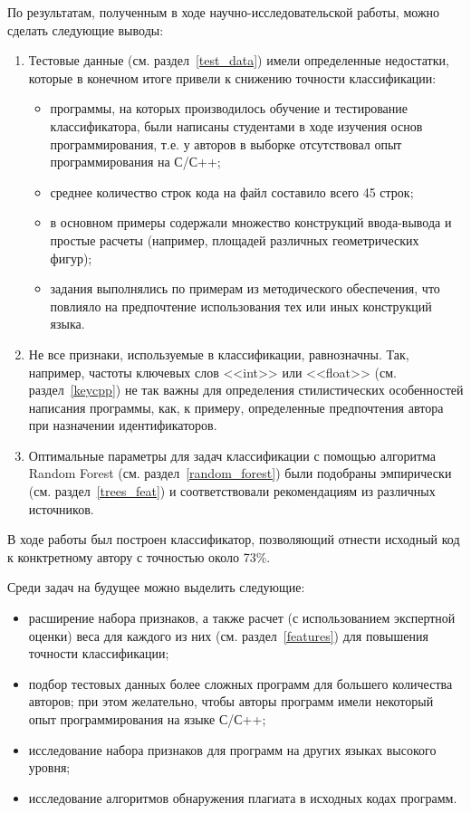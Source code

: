По результатам, полученным в ходе научно-исследовательской работы, можно сделать следующие выводы:
\begin{enumerate}
  \item Тестовые данные (см. раздел~\ref{test_data}) имели определенные недостатки, которые в конечном итоге привели к снижению точности классификации:
  \begin{itemize}
    \item программы, на которых производилось обучение и тестирование классификатора, были написаны студентами в ходе изучения основ программирования, т.е. у авторов в выборке отсутствовал опыт программирования на С/С++;
    \item среднее количество строк кода на файл составило всего 45 строк;
    \item в основном примеры содержали множество конструкций ввода-вывода и простые расчеты (например, площадей различных геометрических фигур);
    \item задания выполнялись по примерам из методического обеспечения, что повлияло на предпочтение использования тех или иных конструкций языка.
  \end{itemize}
  \item Не все признаки, используемые в классификации, равнозначны. Так, например, частоты ключевых слов <<int>> или <<float>> (см. раздел~\ref{keycpp}) не так важны для определения стилистических особенностей написания программы, как, к примеру, определенные предпочтения автора при назначении идентификаторов.
  \item Оптимальные параметры для задач классификации с помощью алгоритма Random Forest (см. раздел~\ref{random_forest}) были подобраны эмпирически (см. раздел~\ref{trees_feat}) и соответствовали рекомендациям из различных источников.
\end{enumerate}

В ходе работы был построен классификатор, позволяющий отнести исходный код к конктретному автору с точностью около 73\%.

Среди задач на будущее можно выделить следующие:
\begin{itemize}
  \item расширение набора признаков, а также расчет (с использованием экспертной оценки) веса для каждого из них (см. раздел~\ref{features}) для повышения точности классификации;
  \item подбор тестовых данных более сложных программ для большего количества авторов; при этом желательно, чтобы авторы программ имели некоторый опыт программирования на языке С/С++;
  \item исследование набора признаков для программ на других языках высокого уровня;
  \item исследование алгоритмов обнаружения плагиата в исходных кодах программ.
\end{itemize}

